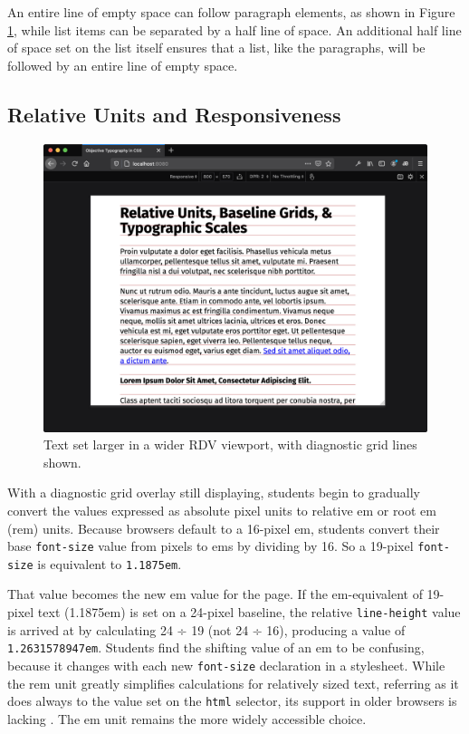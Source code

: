 \documentclass[sigplan,screen]{acmart}
\begin{document}
An entire line of empty space can follow paragraph elements, as shown in Figure \ref{fig:rdv-wide}, while list items can be separated by a half line of space. An additional half line of space set on the list itself ensures that a list, like the paragraphs, will be followed by an entire line of empty space.

\subsection{Relative Units and Responsiveness}

\begin{figure}
  \includegraphics[width=\linewidth]{rdv-wide}
  \caption{Text set larger in a wider RDV viewport, with diagnostic grid lines shown.}
  \label{fig:rdv-wide}
\end{figure}

With a diagnostic grid overlay still displaying, students begin to gradually convert the values expressed as absolute pixel units to relative em or root em (rem) units. Because browsers default to a 16-pixel em, students convert their base \verb|font-size| value from pixels to ems by dividing by 16. So a 19-pixel \verb|font-size| is equivalent to \verb|1.1875em|.

That value becomes the new em value for the page. If the em-equivalent of 19-pixel text (1.1875em) is set on a 24-pixel baseline, the relative \verb|line-height| value is arrived at by calculating 24 ÷ 19 (not 24 ÷ 16), producing a value of \verb|1.2631578947em|. Students find the shifting value of an em to be confusing, because it changes with each new \verb|font-size| declaration in a stylesheet. While the rem unit  greatly simplifies calculations for relatively sized text, referring as it does always to the value set on the \verb|html| selector, its support in older browsers is lacking \cite{ciu:rem}. The em unit remains the more widely accessible choice.
\end{document}
